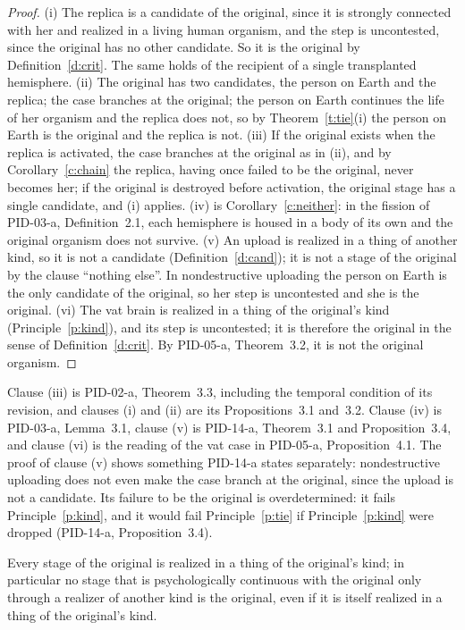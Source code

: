 \documentclass{situationist-preprint}
\begin{document}
\begin{proof}
(i) The replica is a candidate of the original, since it is strongly connected with her and realized in a living human organism, and the step is uncontested, since the original has no other candidate. So it is the original by Definition~\ref{d:crit}. The same holds of the recipient of a single transplanted hemisphere. (ii) The original has two candidates, the person on Earth and the replica; the case branches at the original; the person on Earth continues the life of her organism and the replica does not, so by Theorem~\ref{t:tie}(i) the person on Earth is the original and the replica is not. (iii) If the original exists when the replica is activated, the case branches at the original as in (ii), and by Corollary~\ref{c:chain} the replica, having once failed to be the original, never becomes her; if the original is destroyed before activation, the original stage has a single candidate, and (i) applies. (iv) is Corollary~\ref{c:neither}: in the fission of PID-03-a, Definition~2.1, each hemisphere is housed in a body of its own and the original organism does not survive. (v) An upload is realized in a thing of another kind, so it is not a candidate (Definition~\ref{d:cand}); it is not a stage of the original by the clause \enquote{nothing else}. In nondestructive uploading the person on Earth is the only candidate of the original, so her step is uncontested and she is the original. (vi) The vat brain is realized in a thing of the original's kind (Principle~\ref{p:kind}), and its step is uncontested; it is therefore the original in the sense of Definition~\ref{d:crit}. By PID-05-a, Theorem~3.2, it is not the original organism.
\end{proof}

Clause (iii) is PID-02-a, Theorem~3.3, including the temporal condition of its revision, and clauses (i) and (ii) are its Propositions~3.1 and~3.2. Clause (iv) is PID-03-a, Lemma~3.1, clause (v) is PID-14-a, Theorem~3.1 and Proposition~3.4, and clause (vi) is the reading of the vat case in PID-05-a, Proposition~4.1. The proof of clause (v) shows something PID-14-a states separately: nondestructive uploading does not even make the case branch at the original, since the upload is not a candidate. Its failure to be the original is overdetermined: it fails Principle~\ref{p:kind}, and it would fail Principle~\ref{p:tie} if Principle~\ref{p:kind} were dropped (PID-14-a, Proposition~3.4).

\begin{proposition}[Kind]\label{p:kindprop}
Every stage of the original is realized in a thing of the original's kind; in particular no stage that is psychologically continuous with the original only through a realizer of another kind is the original, even if it is itself realized in a thing of the original's kind.
\end{proposition}
\end{document}
